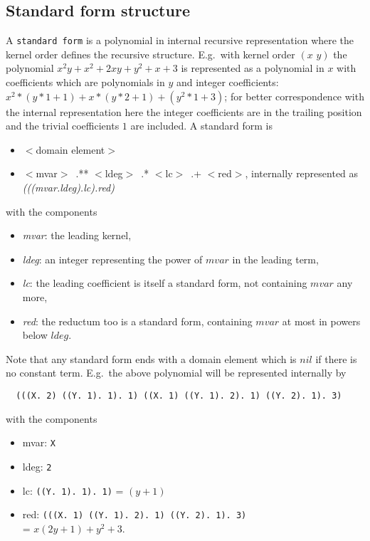 \documentclass[11pt]{article}
\makeatletter
\newcommand{\ttindex}[1]{\index{#1@{\texttt{#1}}}}
\makeatother
\begin{document}
\subsection{Standard form structure}

A {\tt standard form}\ttindex{standard form} is a polynomial in internal recursive
representation where the kernel order defines the recursive
structure. E.g.\  with kernel order $(x\,\,y)$ the polynomial 
$x^2y +x^2 + 2xy + y^2 + x + 3$ is represented as a polynomial
in $x$ with coefficients which are polynomials in $y$ and integer coefficients:
$x^2*(y*1+1) + x*(y*2+1) +(y^2*1 +3)$; for better correspondence
with the internal representation here the integer coefficients
are in the trailing position and the trivial coefficients $1$ are 
included.
A standard form is 

\begin{itemize}
\item $<$domain element$>$  
\item $<$mvar$>$\ .** $<$ldeg$>$\ .* $<$lc$>$\ .+ $<$red$>$, 
    internally represented as {\em (((mvar.ldeg).lc).red)} 
\end{itemize}
with the components
\begin{itemize}
\item {\em mvar}: the leading kernel,
\item {\em ldeg}: an integer representing the power of $mvar$ in the leading
 term,
\item{\em lc}: the leading coefficient is itself a standard form,
 not containing $mvar$ any more,
\item{\em red}: the reductum too is a standard form, containing $mvar$
  at most in powers below $ldeg$.
\end{itemize}
Note that any standard form ends with a domain element which 
is  $nil$ if there is no constant term.
 E.g.\  the above polynomial
will be represented internally by

\begin{verbatim}
  (((X. 2) ((Y. 1). 1). 1) ((X. 1) ((Y. 1). 2). 1) ((Y. 2). 1). 3)
\end{verbatim}

with the components
\begin{itemize}
\item{mvar}: \verb+X+
\item{ldeg}: \verb+2+
\item{lc}: \verb+((Y. 1). 1). 1)+  = $(y+1)$
\item{red}: \verb+(((X. 1) ((Y. 1). 2). 1) ((Y. 2). 1). 3)+ \\
 = $ x(2y+1)+y^2+3$.
\end{itemize}
\end{document}
